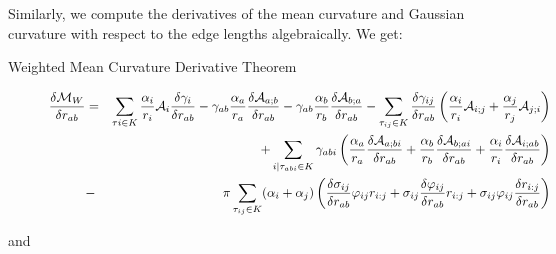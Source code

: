 \documentclass[11 pt]{article}
\newcommand {\mm}[1] {\ifmmode{#1}\else{\mbox{\(#1\)}}\fi}
\theoremstyle{plain} \theorembodyfont{\rmfamily}
\newcommand{\tsx}           {\mm{\tau}}
\begin{document}
Similarly, we compute the derivatives of the mean curvature and Gaussian curvature with respect to the edge lengths algebraically. We get:

\begin{description}
  \item[{\sc Weighted Mean Curvature Derivative Theorem}]
    \begin{eqnarray}
    \frac{\delta \mathcal{M}_W}{\delta r_{ab}}  &=&\sum_{\tsx{i} \in K} \frac{\alpha_i}{r_i} \mathcal{A}_i \frac{\delta \gamma_i}{\delta r_{ab}}   - \gamma_{ab} \frac{\alpha_a}{r_a} \frac{\delta\mathcal{A}_{a;b}}{\delta r_{ab}} - \gamma_{ab} \frac{\alpha_b}{r_b} \frac{\delta \mathcal{A}_{b;a}}{\delta r_{ab}}  
    - \sum_{ \tsx_{ij} \in K} \frac{\delta \gamma_{ij}}{\delta  r_{ab}}  \left(\frac{\alpha_i}{r_i} \mathcal{A}_{i;j} + \frac{\alpha_j}{r_j} \mathcal{A}_{j;i} \right) \nonumber \\
  &&  + \sum_{i \mid \tsx_{abi} \in K} \gamma_{abi} \left(\frac{\alpha_a}{r_a} \frac{\delta \mathcal{A}_{a;bi}}{\delta r_{ab}} + \frac{\alpha_b}{r_b} \frac{\delta \mathcal{A}_{b;ai}}{\delta r_{ab}}+\frac{\alpha_i}{r_i}\frac{\delta \mathcal{A}_{i;ab}}{\delta r_{ab}} \right) \nonumber \\
  &-&  \pi \sum_{\tsx_{ij} \in K} (\alpha_i+\alpha_j) \left(\frac{\delta \sigma_{ij}}{\delta r_{ab}} \varphi_{ij} r_{i:j} + \sigma_{ij} \frac{\delta \varphi_{ij}}{\delta r_{ab}} r_{i:j} + \sigma_{ij}  \varphi_{ij} \frac{\delta r_{i:j}} {\delta r_{ab}}\right)
          \label{eqn:meanderiv}
          \end{eqnarray}
\end{description}
and
\end{document}
